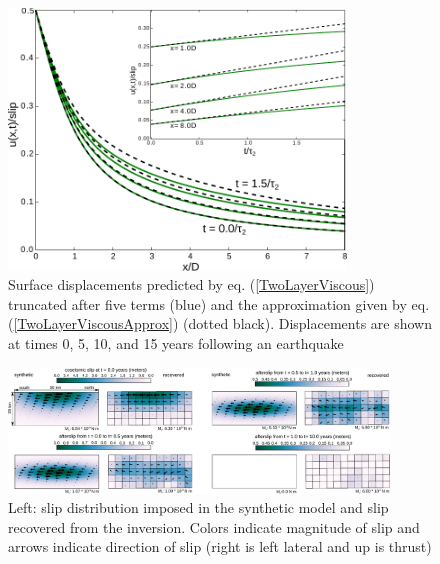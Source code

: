 \documentclass[extra]{gji}
\begin{document}
\begin{figure}[h!]\label{figure1}
  \centering
  \includegraphics[width=0.8\textwidth]{FinalFigures/Figure1.pdf}
  \caption{Surface displacements predicted by
    eq. (\ref{TwoLayerViscous}) truncated after five terms (blue) and
    the approximation given by eq. (\ref{TwoLayerViscousApprox})
    (dotted black).  Displacements are shown at times 0, 5, 10, and 15
    years following an earthquake}
  \label{figure 1}
\end{figure}

\begin{figure}[h!]\label{figure2}
  \centering
  \includegraphics[width=0.9\textwidth]{FinalFigures/Figure2.pdf}
  \caption{Left: slip distribution imposed in the synthetic model and
    slip recovered from the inversion. Colors indicate magnitude of
    slip and arrows indicate direction of slip (right is left lateral
    and up is thrust)}
  \label{figure 2}
\end{figure}
\end{document}
